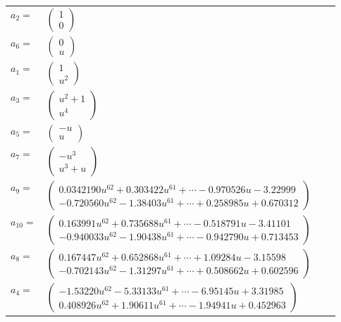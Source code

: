 \documentclass[1p]{elsarticle_modified}
\theoremstyle{definition}
\begin{document}
\begin{tabular}{m{7pt} m{180pt} m{7pt} m{180pt} }
\flushright $a_{2}=$&$\begin{pmatrix}1\\0\end{pmatrix}$ \\
\flushright $a_{6}=$&$\begin{pmatrix}0\\u\end{pmatrix}$ \\
\flushright $a_{1}=$&$\begin{pmatrix}1\\u^2\end{pmatrix}$ \\
\flushright $a_{3}=$&$\begin{pmatrix}u^2+1\\u^4\end{pmatrix}$ \\
\flushright $a_{5}=$&$\begin{pmatrix}- u\\u\end{pmatrix}$ \\
\flushright $a_{7}=$&$\begin{pmatrix}- u^3\\u^3+u\end{pmatrix}$ \\
\flushright $a_{9}=$&$\begin{pmatrix}0.0342190 u^{62}+0.303422 u^{61}+\cdots-0.970526 u-3.22999\\-0.720560 u^{62}-1.38403 u^{61}+\cdots+0.258985 u+0.670312\end{pmatrix}$ \\
\flushright $a_{10}=$&$\begin{pmatrix}0.163991 u^{62}+0.735688 u^{61}+\cdots-0.518791 u-3.41101\\-0.940033 u^{62}-1.90438 u^{61}+\cdots-0.942790 u+0.713453\end{pmatrix}$ \\
\flushright $a_{8}=$&$\begin{pmatrix}0.167447 u^{62}+0.652868 u^{61}+\cdots+1.09284 u-3.15598\\-0.702143 u^{62}-1.31297 u^{61}+\cdots+0.508662 u+0.602596\end{pmatrix}$ \\
\flushright $a_{4}=$&$\begin{pmatrix}-1.53220 u^{62}-5.33133 u^{61}+\cdots-6.95145 u+3.31985\\0.408926 u^{62}+1.90611 u^{61}+\cdots-1.94941 u+0.452963\end{pmatrix}$ \\

\end{tabular}
\end{document}
